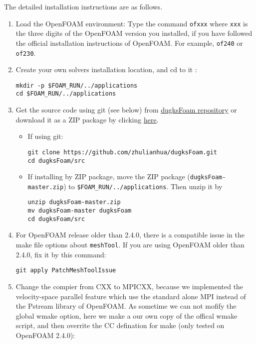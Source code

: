 The detailed installation instructions are as follows.
\begin{enumerate}
\item Load the OpenFOAM environment:
Type the command \texttt{ofxxx} where \texttt{xxx} is the three digits of the OpenFOAM version you installed,
if you have followed the official installation instructions of OpenFOAM. For example, \texttt{of240} or \texttt{of230}.
\item Create your own solvers installation location, and cd to it :
\begin{verbatim}
mkdir -p $FOAM_RUN/../applications
cd $FOAM_RUN/../applications
\end{verbatim}
\item Get the source code using git (see below) from \href{https://github.com/zhulianhua/dugksFoam}{dugksFoam repository}
or download it as a ZIP package by clicking \href{https://github.com/zhulianhua/dugksFoam/archive/master.zip}{here}.
\begin{itemize}
\item If using git:
\begin{verbatim}
git clone https://github.com/zhulianhua/dugksFoam.git
cd dugksFoam/src
\end{verbatim}
\item If installing by ZIP package, move the ZIP package (\texttt{dugksFoam-master.zip}) to \verb|$FOAM_RUN/../applications|. Then unzip it by
\begin{verbatim}
unzip dugksFoam-master.zip
mv dugksFoam-master dugksFoam
cd dugksFoam/src
\end{verbatim}
\end{itemize}

\item For OpenFOAM release older than 2.4.0, there is a compatible issue in the make file options about \verb|meshTool|.
If you are using OpenFOAM older than 2.4.0, fix it by this command:
\begin{verbatim}
git apply PatchMeshToolIssue
\end{verbatim}

\item Change the compier from CXX to MPICXX, because we implemented the velocity-space parallel feature which use the standard alone MPI instead of the Pstream library of OpenFOAM. As sometime we can not mofify the global wmake option, here we make a our own copy of the offical wmake script, and then overrite the CC defination for make (only tested on OpenFOAM 2.4.0): 


\end{enumerate}
